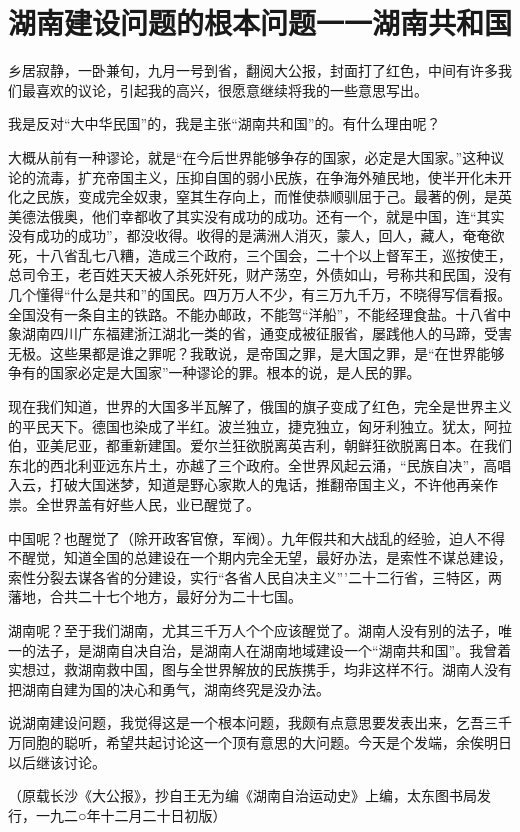 \section{湖南建设问题的根本问题一一湖南共和国}



乡居寂静，一卧兼旬，九月一号到省，翻阅大公报，封面打了红色，中间有许多我们最喜欢的议论，引起我的高兴，很愿意继续将我的一些意思写出。

我是反对“大中华民国”的，我是主张“湖南共和国”的。有什么理由呢？

大概从前有一种谬论，就是“在今后世界能够争存的国家，必定是大国家。”这种议论的流毒，扩充帝国主义，压抑自国的弱小民族，在争海外殖民地，使半开化未开化之民族，变成完全奴隶，窒其生存向上，而惟使恭顺驯屈于己。最著的例，是英美德法俄奥，他们幸都收了其实没有成功的成功。还有一个，就是中国，连“其实没有成功的成功”，都没收得。收得的是满洲人消灭，蒙人，回人，藏人，奄奄欲死，十八省乱七八糟，造成三个政府，三个国会，二十个以上督军王，巡按使王，总司令王，老百姓天天被人杀死奸死，财产荡空，外债如山，号称共和民国，没有几个懂得“什么是共和”的国民。四万万人不少，有三万九千万，不晓得写信看报。全国没有一条自主的铁路。不能办邮政，不能驾“洋船”，不能经理食盐。十八省中象湖南四川广东福建浙江湖北一类的省，通变成被征服省，屡践他人的马蹄，受害无极。这些果都是谁之罪呢？我敢说，是帝国之罪，是大国之罪，是“在世界能够争有的国家必定是大国家”一种谬论的罪。根本的说，是人民的罪。

现在我们知道，世界的大国多半瓦解了，俄国的旗子变成了红色，完全是世界主义的平民天下。德国也染成了半红。波兰独立，捷克独立，匈牙利独立。犹太，阿拉伯，亚美尼亚，都重新建国。爱尔兰狂欲脱离英吉利，朝鲜狂欲脱离日本。在我们东北的西北利亚远东片土，亦越了三个政府。全世界风起云涌，“民族自决”，高唱入云，打破大国迷梦，知道是野心家欺人的鬼话，推翻帝国主义，不许他再亲作祟。全世界盖有好些人民，业已醒觉了。

中国呢？也醒觉了（除开政客官僚，军阀）。九年假共和大战乱的经验，迫人不得不醒觉，知道全国的总建设在一个期内完全无望，最好办法，是索性不谋总建设，索性分裂去谋各省的分建设，实行“各省人民自决主义”’二十二行省，三特区，两藩地，合共二十七个地方，最好分为二十七国。

湖南呢？至于我们湖南，尤其三千万人个个应该醒觉了。湖南人没有别的法子，唯一的法子，是湖南自决自治，是湖南人在湖南地域建设一个“湖南共和国”。我曾着实想过，救湖南救中国，图与全世界解放的民族携手，均非这样不行。湖南人没有把湖南自建为国的决心和勇气，湖南终究是没办法。

说湖南建设问题，我觉得这是一个根本问题，我颇有点意思要发表出来，乞吾三千万同胞的聪听，希望共起讨论这一个顶有意思的大问题。今天是个发端，余俟明日以后继该讨论。

{\raggedleft（原载长沙《大公报》，抄自王无为编《湖南自治运动史》上编，太东图书局发行，一九二○年十二月二十日初版）}

